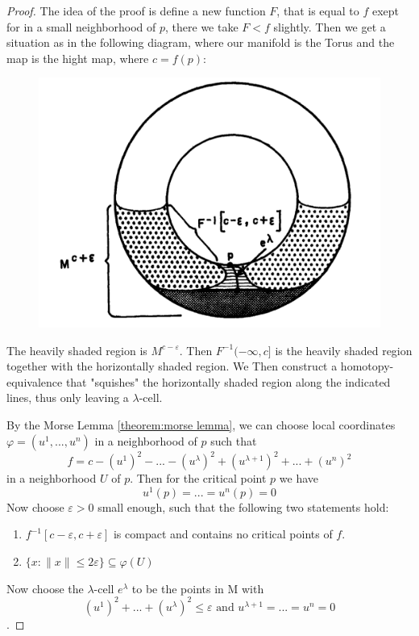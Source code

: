\begin{proof}
   The idea of the proof is define a new function $F$, that is equal to $f$
   exept for in a small neighborhood of $p$, there we take $F < f$ slightly. 
   Then we get a situation as in the following diagram, where our manifold is
   the Torus and the map is the hight map, where $c = f(p)$:

   \begin{figure}[H]
      \centering
      \includegraphics[width=0.5\linewidth]{resources/Mil-Diagram4.png}
      \label{fig:mil-diagram4}
   \end{figure}

   The heavily shaded region is $M^{c-\varepsilon}$. Then $F^{-1}(-\infty, c]$ is
   the heavily shaded region together with the horizontally shaded region. We Then
   construct a homotopy-equivalence that "squishes" the horizontally shaded region
   along the indicated lines, thus only leaving a $\lambda$-cell.

   By the Morse Lemma \ref{theorem:morse lemma}, we can choose local coordinates
   $\varphi = (u^1, ..., u^n)$ in a neighborhood of $p$ such that 
   \[ f = c -  (u^1)^2 - ... - (u^{\lambda})^2 + (u^{\lambda + 1})^2 + ... + (u^n)^2 \]
   in a neighborhood $U$ of $p$. Then for the critical point $p$ we have
   \[ u^1(p) = ... = u^n(p) = 0 \]
   Now choose $\varepsilon > 0$ small enough, such that the following two 
   statements hold:
   \begin{enumerate}
      \item $f^{-1}[c - \varepsilon, c + \varepsilon]$ is compact and contains
         no critical points of $f$.
      \item $\{ x: \lVert x \rVert \leq 2\varepsilon \} \subseteq \varphi(U)$
   \end{enumerate}

   Now choose the $\lambda$-cell $e^{\lambda}$ to be the points in M with
   \[ (u^1)^2 + ... + (u^{\lambda})^2 \leq \varepsilon 
   \text{ and } u^{\lambda + 1} = ... = u^n = 0 \].


\end{proof}
